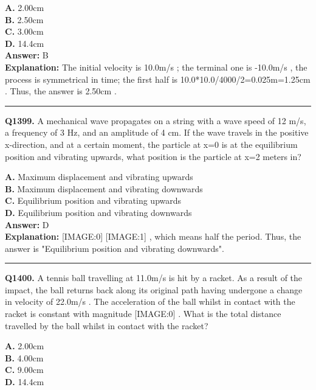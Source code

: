 \documentclass[12pt]{article}
\begin{document}
\textbf{A.} 2.00cm \\
\textbf{B.} 2.50cm \\
\textbf{C.} 3.00cm \\
\textbf{D.} 14.4cm \\

\textbf{Answer:} B \\
\textbf{Explanation:} The initial velocity is 10.0m/s
; the terminal one is -10.0m/s
, the process is symmetrical in time; the first half is 10.0*10.0/4000/2=0.025m=1.25cm
. Thus, the answer is 2.50cm
.

\hrule
\vspace{1em}


\noindent
\textbf{Q1399.} A mechanical wave propagates on a string with a wave speed of 12 m/s, a frequency of 3 Hz, and an amplitude of 4 cm. If the wave travels in the positive x-direction, and at a certain moment, the particle at x=0 is at the equilibrium position and vibrating upwards, what position is the particle at x=2 meters in?



\textbf{A.} Maximum displacement and vibrating upwards \\
\textbf{B.} Maximum displacement and vibrating downwards \\
\textbf{C.} Equilibrium position and vibrating upwards \\
\textbf{D.} Equilibrium position and vibrating downwards \\

\textbf{Answer:} D \\
\textbf{Explanation:} [IMAGE:0]
[IMAGE:1]
, which means half the period. Thus, the answer is "Equilibrium position and vibrating downwards".

\hrule
\vspace{1em}


\noindent
\textbf{Q1400.} A tennis ball travelling at 11.0m/s
is hit by a racket. As a result of the impact, the ball returns back along its original path having undergone a change in velocity of 22.0m/s
. The acceleration of the ball whilst in contact with the racket is constant with magnitude
[IMAGE:0]
.
What is the total distance travelled by the ball whilst in contact with the racket?



\textbf{A.} 2.00cm \\
\textbf{B.} 4.00cm \\
\textbf{C.} 9.00cm \\
\textbf{D.} 14.4cm \\
\end{document}
